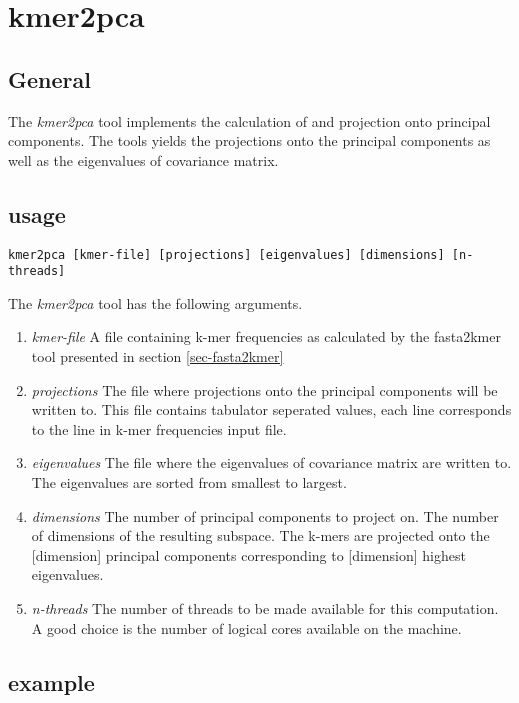 \section{kmer2pca} \label{sec-kmer2pca}

\subsection{General}

The \emph{kmer2pca} tool implements the calculation of and projection onto
principal components. The tools yields the projections onto the
principal components as well as the eigenvalues of covariance matrix.

\subsection{usage}

\begin{lstlisting}
kmer2pca [kmer-file] [projections] [eigenvalues] [dimensions] [n-threads]
\end{lstlisting}
The \emph{kmer2pca} tool has the following arguments.
\begin{enumerate}
  \item \emph{kmer-file} A file containing k-mer frequencies as
    calculated by the fasta2kmer tool presented in section
    \ref{sec-fasta2kmer}
  \item \emph{projections} The file where projections onto the
    principal components will be written to. This file contains
    tabulator seperated values, each line corresponds to the line in
    k-mer frequencies input file.
  \item \emph{eigenvalues} The file where the eigenvalues of
    covariance matrix are written to. The eigenvalues are sorted from
    smallest to largest.
  \item \emph{dimensions} The number of principal components to
    project on. The number of dimensions of the resulting
    subspace. The k-mers are projected onto the [dimension]
    principal components corresponding to [dimension] highest
    eigenvalues.
  \item \emph{n-threads} The number of threads to be made available
    for this computation. A good choice is the number of logical cores
    available on the machine.
\end{enumerate}

\subsection{example}

